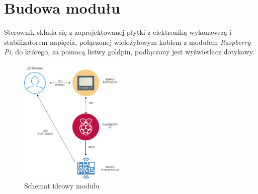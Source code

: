 \documentclass[12pt, eng, twoside, openany, final]{mgr}
\begin{document}
    
    \section{Budowa modułu}
    Sterownik składa się z zaprojektowanej płytki z elektroniką wykonawczą i stabilizatorem napięcia, połączonej wielożyłowym kablem z modułem \emph{Raspberry Pi}, do którego, za pomocą listwy goldpin, podłączony jest wyświetlacz dotykowy.
        \begin{figure}[H]
        \begin{center}
            \includegraphics[width=0.45\textwidth]{diagram.jpg}
            \caption{Schemat ideowy modułu}
        \end{center}
        \end{figure}
        
\end{document}

